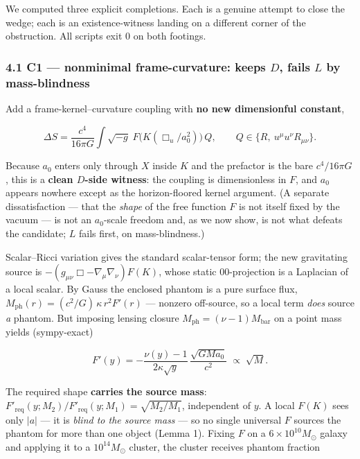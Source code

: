 \documentclass[
]{article}
\begin{document}
We computed three explicit completions. Each is a genuine attempt to
close the wedge; each is an existence-witness landing on a different
corner of the obstruction. All scripts exit 0 on both footings.

\subsubsection{\texorpdfstring{4.1 C1 --- nonminimal frame-curvature:
keeps \(D\), fails \(L\) by
mass-blindness}{4.1 C1 --- nonminimal frame-curvature: keeps D, fails L by mass-blindness}}\label{c1-nonminimal-frame-curvature-keeps-d-fails-l-by-mass-blindness}

Add a frame-kernel--curvature coupling with \textbf{no new dimensionful
constant},

\[
\Delta S = \frac{c^4}{16\pi G}\int\sqrt{-g}\; F\!\big(K(\Box_u/a_0^2)\big)\, Q, \qquad Q\in\{R,\ u^\mu u^\nu R_{\mu\nu}\}.
\]

Because \(a_0\) enters only through \(X\) inside \(K\) and the prefactor
is the bare \(c^4/16\pi G\), this is a \textbf{clean \(D\)-side
witness}: the coupling is dimensionless in \(F\), and \(a_0\) appears
nowhere except as the horizon-floored kernel argument. (A separate
dissatisfaction --- that the \emph{shape} of the free function \(F\) is
not itself fixed by the vacuum --- is not an \(a_0\)-scale freedom and,
as we now show, is not what defeats the candidate; \(L\) fails first, on
mass-blindness.)

Scalar--Ricci variation gives the standard scalar-tensor form; the new
gravitating source is \(-(g_{\mu\nu}\Box-\nabla_\mu\nabla_\nu)F(K)\),
whose static \(00\)-projection is a Laplacian of a local scalar. By
Gauss the enclosed phantom is a pure surface flux,
\(M_\mathrm{ph}(r)=(c^2/G)\,\kappa\,r^2 F'(r)\) --- nonzero off-source, so
a local term \emph{does} source \emph{a} phantom. But imposing lensing
closure \(M_\mathrm{ph}=(\nu-1)M_\mathrm{bar}\) on a point mass yields
(sympy-exact)

\[
F'(y) = -\frac{\nu(y)-1}{2\kappa\sqrt y}\,\frac{\sqrt{GMa_0}}{c^2} \;\propto\; \sqrt{M}.
\]

The required shape \textbf{carries the source mass}:
\(F'_\mathrm{req}(y;M_2)/F'_\mathrm{req}(y;M_1)=\sqrt{M_2/M_1}\), independent
of \(y\). A local \(F(K)\) sees only \(|a|\) --- it is \emph{blind to
the source mass} --- so no single universal \(F\) sources the phantom
for more than one object (Lemma 1). Fixing \(F\) on a
\(6\times10^{10}M_\odot\) galaxy and applying it to a \(10^{14}M_\odot\)
cluster, the cluster receives phantom fraction
\end{document}
